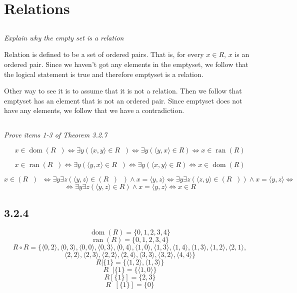 \documentclass[11pt,oneside,titlepage]{book}
\DeclareMathOperator \inv {^{-1}}
\DeclareMathOperator \lra {\Leftrightarrow}
\DeclareMathOperator \dom {dom}
\DeclareMathOperator \ran {ran}
\newcommand{\eangle}[1]{\langle #1 \rangle}
\begin{document}
\section{Relations}

\subsection{}

\textit{Explain why the empty set is a relation}

Relation is defined to be a set of ordered pairs. That is, for every $x \in R$, $x$ is an ordered pair.
Since we haven't got any elements in the emptyset, we follow that the logical statement is true and  therefore
emptyset is a relation.

Other way to see it is to assume that it is not a relation. Then we follow that emptyset has an element that
is not an ordered pair. Since emptyset does not have any elements, we follow that we have
a contradiction.

\subsection{}

\textit{Prove items 1-3 of Theorem 3.2.7}

$$x \in \dom(R \inv) \lra \exists y (\eangle{x, y} \in R \inv)
\lra \exists y (\eangle{y, x} \in R) \lra x \in \ran(R)$$

$$x \in \ran(R \inv) \lra \exists y (\eangle{y, x} \in R \inv)
\lra \exists y (\eangle{x, y} \in R) \lra x \in \dom(R)$$

$$x \in (R \inv) \inv \lra \exists y \exists z (\eangle{y, z} \in (R \inv) \inv ) \land x = \eangle{y, z}
\lra \exists y \exists z (\eangle{z, y} \in (R \inv) ) \land x = \eangle{y, z} \lra $$
$$ \lra  \exists y \exists z (\eangle{y, z} \in R ) \land x = \eangle{y, z} \lra x \in R$$


\subsection*{3.2.4}

$$\dom(R) = \{0, 1, 2, 3, 4\}$$
$$\ran(R) = \{0, 1, 2, 3, 4\}$$
$$R \circ R = \{\eangle{0, 2}, \eangle{0, 3}, \eangle{0, 0}, \eangle{0, 3}, \eangle{0, 4},
\eangle{1, 0}, \eangle{1, 3}, \eangle{1, 4}, \eangle{1, 3}, \eangle{1, 2}, \eangle{2, 1},$$
$$ 
\eangle{2, 2}, \eangle{2, 3}, \eangle{2, 2}, \eangle{2, 4}, \eangle{3, 3}, \eangle{3, 2},
\eangle{4, 4}\}$$
$$R|\{1\} = \{\eangle{1, 2}, \eangle{1, 3}\}$$
$$R\inv|\{1\} = \{\eangle{1, 0}\}$$
$$R[\{1\}] = \{2, 3\}$$
$$R\inv[\{1\}] = \{0\}$$
\end{document}
